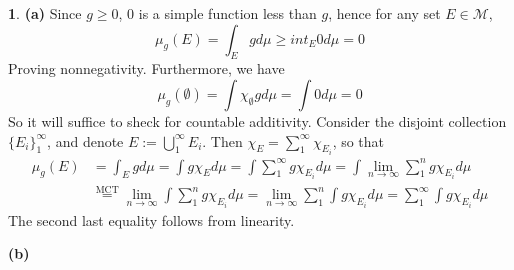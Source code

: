 \documentclass[10.5pt]{article}
\theoremstyle{definition}
\newtheorem{pb}{}
\newcommand{\set}[1]{\{#1\}}
\begin{document}
\begin{pb}
    \textbf{(a)} Since \(g \geq 0\), \(0\) is a simple function less than \(g\), hence for any set \(E \in \mathcal{M}\),
    \[\mu_g(E) = \int_E g d\mu \geq int_E 0 d\mu = 0\]
    Proving nonnegativity. Furthermore, we have \[\mu_g(\emptyset) = \int \chi_\emptyset g d\mu = \int 0 d\mu = 0\]
    So it will suffice to sheck for countable additivity. Consider the disjoint collection \(\set{E_i}_1^\infty\), and denote \(E := \bigcup_1^\infty E_i\).
    Then \(\chi_E = \sum_1^\infty \chi_{E_i}\), so that
    \begin{align*}
        \mu_g(E) &= \int_E gd\mu = \int g\chi_E d\mu = \int \sum_1^\infty g \chi_{E_i} d\mu = \int \lim_{n\to\infty} \sum_1^n g \chi_{E_i} d\mu \\
    &\overset{\text{MCT}}{=} \lim_{n\to\infty}\int \sum_1^n g\chi_{E_i}d\mu = \lim_{n\to\infty} \sum_1^n \int g\chi_{E_i}d\mu = \sum_1^\infty \int g\chi_{E_i}d\mu
\end{align*}
    The second last equality follows from linearity.

    \textbf{(b)}
\end{pb}
\end{document}
